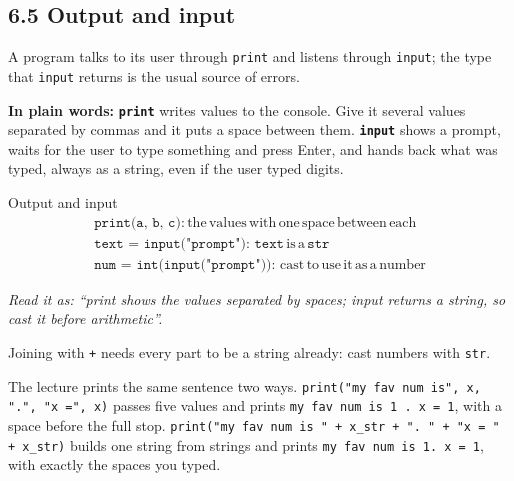 \documentclass[11pt]{article}
\begin{document}
\begin{keepsection}
\section{6.5 Output and input}

A program talks to its user through \texttt{print} and listens through \texttt{input}; the type that \texttt{input} returns is the usual source of errors.

\begin{plainbox}\textbf{In plain words:} \textbf{\texttt{print}} writes values to the console. Give it several values separated by commas and it puts a space between them. \textbf{\texttt{input}} shows a prompt, waits for the user to type something and press Enter, and hands back what was typed, always as a string, even if the user typed digits.\end{plainbox}

\begin{equationcard}{Output and input}
\[ \begin{gathered} \texttt{print(a, b, c)}:\, \text{the}\, \text{values}\, \text{with}\, \text{one}\, \text{space}\, \text{between}\, \text{each} \\ \texttt{text = input("prompt")}:\, \texttt{text}\, \text{is}\, \mathrm{a}\, \texttt{str} \\ \texttt{num = int(input("prompt"))}:\, \text{cast}\, \text{to}\, \text{use}\, \text{it}\, \text{as}\, \mathrm{a}\, \text{number} \end{gathered} \]
{\small \emph{Read it as: “print shows the values separated by spaces; input returns a string, so cast it before arithmetic”.}\par  Joining with \texttt{+} needs every part to be a string already: cast numbers with \texttt{str}.}
\end{equationcard}

The lecture prints the same sentence two ways. \texttt{print("my fav num is", x, ".", "x =", x)} passes five values and prints \texttt{my fav num is 1 . x = 1}, with a space before the full stop. \texttt{print("my fav num is " + x\_str + ". " + "x = " + x\_str)} builds one string from strings and prints \texttt{my fav num is 1. x = 1}, with exactly the spaces you typed.


\end{keepsection}
\end{document}
